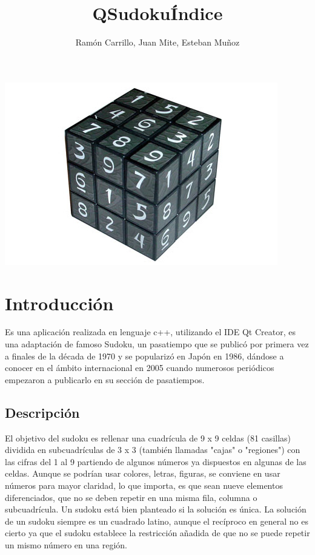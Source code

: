 \documentclass[11pt]{book} %
\begin{document}
\title{QSudoku}
\includegraphics{sudo.jpg}
\author{Ramón Carrillo, Juan Mite,  Esteban Muñoz}

\maketitle
\title{Índice}
\section{Introducción}
Es una aplicación realizada en lenguaje c++, utilizando el IDE Qt Creator, es una adaptación de famoso Sudoku, un pasatiempo que se publicó por primera vez a finales de la década de 1970 y se popularizó en Japón en 1986, dándose a conocer en el ámbito internacional en 2005 cuando numerosos periódicos empezaron a publicarlo en su sección de pasatiempos. 
\subsection{Descripción}
	El objetivo del sudoku es rellenar una cuadrícula de 9 x 9 celdas (81 casillas) dividida en subcuadrículas de 3 x 3 (también llamadas "cajas" o "regiones") con las cifras del 1 al 9 partiendo de algunos números ya dispuestos en algunas de las celdas. Aunque se podrían usar colores, letras, figuras, se conviene en usar números para mayor claridad, lo que importa, es que sean nueve elementos diferenciados, que no se deben repetir en una misma fila, columna o subcuadrícula. Un sudoku está bien planteado si la solución es única. La solución de un sudoku siempre es un cuadrado latino, aunque el recíproco en general no es cierto ya que el sudoku establece la restricción añadida de que no se puede repetir un mismo número en una región. 
\end{document}
